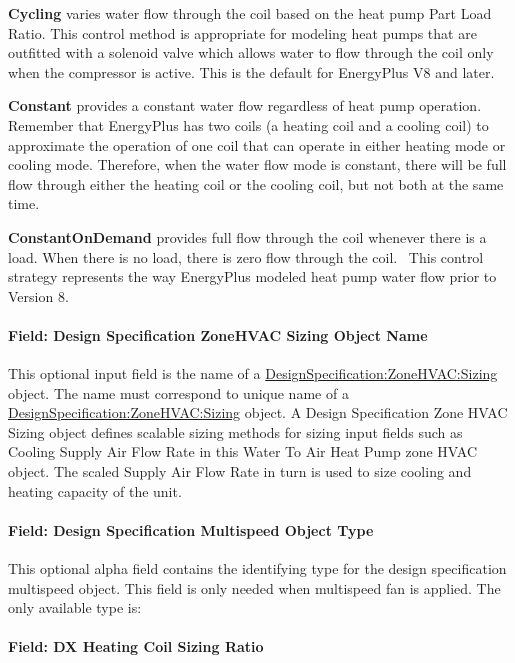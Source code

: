 \textbf{Cycling} varies water flow through the coil based on the heat pump Part Load Ratio. This control method is appropriate for modeling heat pumps that are outfitted with a solenoid valve which allows water to flow through the coil only when the compressor is active. This is the default for EnergyPlus V8 and later.

\textbf{Constant} provides a constant water flow regardless of heat pump operation. Remember that EnergyPlus has two coils (a heating coil and a cooling coil) to approximate the operation of one coil that can operate in either heating mode or cooling mode. Therefore, when the water flow mode is constant, there will be full flow through either the heating coil or the cooling coil, but not both at the same time.

\textbf{ConstantOnDemand} provides full flow through the coil whenever there is a load. When there is no load, there is zero flow through the coil.~ This control strategy represents the way EnergyPlus modeled heat pump water flow prior to Version 8.

\paragraph{Field: Design Specification ZoneHVAC Sizing Object Name}\label{field-design-specification-zonehvac-sizing-object-name-8}

This optional input field is the name of a \hyperref[designspecificationzonehvacsizing]{DesignSpecification:ZoneHVAC:Sizing} object. The name must correspond to unique name of a \hyperref[designspecificationzonehvacsizing]{DesignSpecification:ZoneHVAC:Sizing} object. A Design Specification Zone HVAC Sizing object defines scalable sizing methods for sizing input fields such as Cooling Supply Air Flow Rate in this Water To Air Heat Pump zone HVAC object. The scaled Supply Air Flow Rate in turn is used to size cooling and heating capacity of the unit.

\paragraph{Field: Design Specification Multispeed Object Type}\label{field-design-specification-multispeed-object-type-2}

This optional alpha field contains the identifying type for the design specification multispeed object. This field is only needed when multispeed fan is applied. The only available type is:

\paragraph{Field: DX Heating Coil Sizing Ratio}\label{field-dx-heating-coil-sizing-ratio-0102}

